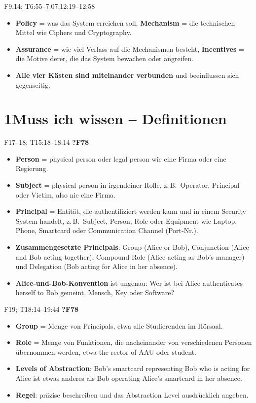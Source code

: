 \documentclass[10pt,a4paper]{article}
\newcommand{\block}[2]{\par\vspace{3pt}{\bfseries #1}\hfill{\scriptsize #2}\par\nopagebreak}
\begin{document}
\block{Security Engineering Analysis Framework (Figure 1.1)}{F9,14; T6:55--7:07,12:19--12:58}
\begin{itemize}
\item \textbf{Policy} = was das System erreichen soll, \textbf{Mechanism} = die technischen Mittel wie Ciphers und Cryptography.
\item \textbf{Assurance} = wie viel Verlass auf die Mechanismen besteht, \textbf{Incentives} = die Motive derer, die das System bewachen oder angreifen.
\item \textbf{Alle vier Kästen sind miteinander verbunden} und beeinflussen sich gegenseitig.
\end{itemize}

\section*{1\quad Muss ich wissen -- Definitionen}
\block{Person, Subject, Principal}{F17--18; T15:18--18:14 \quad \textbf{?F78}}
\begin{itemize}
\item \textbf{Person} = physical person oder legal person wie eine Firma oder eine Regierung.
\item \textbf{Subject} = physical person in irgendeiner Rolle, z.\,B.\ Operator, Principal oder Victim, also nie eine Firma.
\item \textbf{Principal} = Entität, die authentifiziert werden kann und in einem Security System handelt, z.\,B.\ Subject, Person, Role oder Equipment wie Laptop, Phone, Smartcard oder Communication Channel (Port-Nr.).
\item \textbf{Zusammengesetzte Principals}: Group (Alice or Bob), Conjunction (Alice and Bob acting together), Compound Role (Alice acting as Bob's manager) und Delegation (Bob acting for Alice in her absence).
\item \textbf{Alice-und-Bob-Konvention} ist ungenau: Wer ist bei \glqq Alice authenticates herself to Bob\grqq{} gemeint, Mensch, Key oder Software?
\end{itemize}
\block{Group vs.\ Role und Levels of Abstraction}{F19; T18:14--19:44 \quad \textbf{?F78}}
\begin{itemize}
\item \textbf{Group} = Menge von Principals, etwa alle Studierenden im Hörsaal.
\item \textbf{Role} = Menge von Funktionen, die nacheinander von verschiedenen Personen übernommen werden, etwa \glqq the rector of AAU\grqq{} oder \glqq student\grqq.
\item \textbf{Levels of Abstraction}: \glqq Bob's smartcard representing Bob who is acting for Alice\grqq{} ist etwas anderes als \glqq Bob operating Alice's smartcard in her absence\grqq.
\item \textbf{Regel}: präzise beschreiben und das Abstraction Level ausdrücklich angeben.
\end{itemize}
\end{document}
